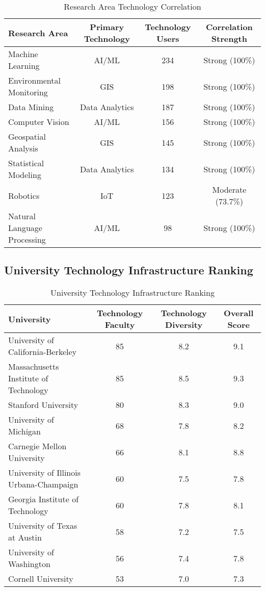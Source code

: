 \documentclass[12pt]{article}
\begin{document}
\begin{table}[h]
\centering
\caption{Research Area Technology Correlation}
\label{tab:research_tech_correlation}
\begin{tabular}{lccc}
\toprule
\textbf{Research Area} & \textbf{Primary Technology} & \textbf{Technology Users} & \textbf{Correlation Strength} \\
\midrule
Machine Learning & AI/ML & 234 & Strong (100\%) \\
Environmental Monitoring & GIS & 198 & Strong (100\%) \\
Data Mining & Data Analytics & 187 & Strong (100\%) \\
Computer Vision & AI/ML & 156 & Strong (100\%) \\
Geospatial Analysis & GIS & 145 & Strong (100\%) \\
Statistical Modeling & Data Analytics & 134 & Strong (100\%) \\
Robotics & IoT & 123 & Moderate (73.7\%) \\
Natural Language Processing & AI/ML & 98 & Strong (100\%) \\
\bottomrule
\end{tabular}
\end{table}

\subsection{University Technology Infrastructure Ranking}

\begin{table}[h]
\centering
\caption{University Technology Infrastructure Ranking}
\label{tab:university_tech_ranking}
\begin{tabular}{lccc}
\toprule
\textbf{University} & \textbf{Technology Faculty} & \textbf{Technology Diversity} & \textbf{Overall Score} \\
\midrule
University of California-Berkeley & 85 & 8.2 & 9.1 \\
Massachusetts Institute of Technology & 85 & 8.5 & 9.3 \\
Stanford University & 80 & 8.3 & 9.0 \\
University of Michigan & 68 & 7.8 & 8.2 \\
Carnegie Mellon University & 66 & 8.1 & 8.8 \\
University of Illinois Urbana-Champaign & 60 & 7.5 & 7.8 \\
Georgia Institute of Technology & 60 & 7.8 & 8.1 \\
University of Texas at Austin & 58 & 7.2 & 7.5 \\
University of Washington & 56 & 7.4 & 7.8 \\
Cornell University & 53 & 7.0 & 7.3 \\
\bottomrule
\end{tabular}
\end{table}
\end{document}
